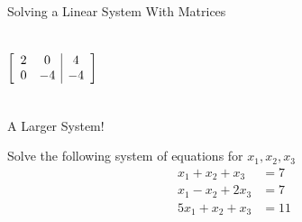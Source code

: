 \documentclass[xcoler=dvipsnames, aspectratio=169]{beamer}
\begin{document}
\begin{frame}{Solving a Linear System With Matrices}
\begin{columns}
{            \[
                \aMat{cc|c}{
                    2 & 0 & 4 \\
                    0 &-4 & -4
                }
            \]
        }
    \end{columns}
\end{frame}
\begin{frame}{A Larger System!}
    \begin{practice}
        Solve the following system of equations for $x_1,x_2,x_3$ 
        \begin{align*}
            x_1 + x_2 + x_3 &= 7\\
            x_1 - x_2 + 2x_3 &= 7\\
            5x_1 + x_2 + x_3 &= 11
        \end{align*}
    \end{practice}
\end{frame}
\end{document}
